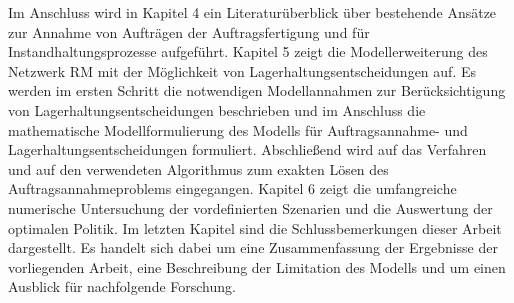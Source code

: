 Im Anschluss wird in Kapitel 4 ein Literaturüberblick über bestehende Ansätze zur Annahme von Aufträgen der Auftragsfertigung und für Instandhaltungsprozesse aufgeführt. Kapitel 5 zeigt die Modellerweiterung des Netzwerk RM mit der Möglichkeit von Lagerhaltungsentscheidungen auf. Es werden im ersten Schritt die notwendigen Modellannahmen zur Berücksichtigung von Lagerhaltungsentscheidungen beschrieben und im Anschluss die mathematische Modellformulierung des Modells für Auftragsannahme- und Lagerhaltungsentscheidungen formuliert. Abschließend wird auf das Verfahren und auf den verwendeten Algorithmus zum exakten Lösen des Auftragsannahmeproblems eingegangen. Kapitel 6 zeigt die umfangreiche numerische Untersuchung der vordefinierten Szenarien und die Auswertung der optimalen Politik. Im letzten Kapitel sind die Schlussbemerkungen dieser Arbeit dargestellt. Es handelt sich dabei um eine Zusammenfassung der Ergebnisse der vorliegenden Arbeit, eine Beschreibung der Limitation des Modells und um einen Ausblick für nachfolgende Forschung.